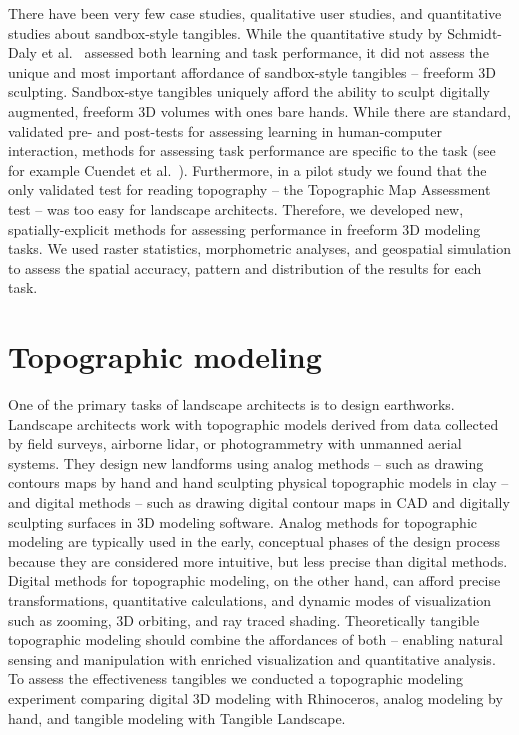 \documentclass[Afour,sagev,times]{sagej} %
\begin{document}
There have been very few 
case studies, \cite{Ishii2002,Tateosian2010,Petrasova2015}
qualitative user studies, 
\cite{Shamonsky2003,Woods2016}
and quantitative studies \cite{Schmidt-daly2016b}
about sandbox-style tangibles.
%
While the quantitative study by
Schmidt-Daly et al.~\cite{Schmidt-daly2016b} 
assessed both learning and task performance,
it did not assess the unique and most important 
affordance of sandbox-style tangibles --
freeform 3D sculpting. 
% 
Sandbox-stye tangibles uniquely afford
the ability to sculpt digitally augmented, 
freeform 3D volumes
with ones bare hands. 
%
While there are standard, validated
pre- and post-tests for assessing learning
in human-computer interaction,
methods for assessing task performance 
are specific to the task
(see for example Cuendet et al.~\cite{Cuendet2012}).
%
Furthermore,
in a pilot study we found that the only 
validated test for reading topography -- the
Topographic Map Assessment test
\cite{Newcombe2015} --
was too easy for landscape architects.
%
Therefore, we developed 
new, spatially-explicit methods
for assessing performance
in freeform 3D modeling tasks.
%
We used raster statistics, 
morphometric analyses, and geospatial simulation
to assess the spatial accuracy, pattern and distribution
of the results for each task. 


\section{Topographic modeling}
%
One of the primary tasks of landscape architects is to design earthworks.
\cite{Petschek2008,Strom2013}
Landscape architects work with topographic models 
derived from data collected by field surveys, airborne lidar, 
or photogrammetry with unmanned aerial systems.
They design new landforms 
using analog methods -- such as 
drawing contours maps by hand and
hand sculpting physical topographic models in clay --
and digital methods -- such as 
drawing digital contour maps in CAD and
digitally sculpting surfaces in 3D modeling software. 
Analog methods for topographic modeling are typically used 
in the early, conceptual phases of the design process because 
they are considered more intuitive, but less precise than digital methods.
Digital methods for topographic modeling, on the other hand, 
can afford precise transformations, 
quantitative calculations, 
and dynamic modes of visualization such as 
zooming, 3D orbiting, and ray traced shading.
Theoretically tangible topographic modeling 
should combine the affordances of both -- 
enabling natural sensing and manipulation
with enriched visualization and quantitative analysis.
To assess the effectiveness tangibles
we conducted a topographic modeling experiment
comparing 
digital 3D modeling with Rhinoceros, 
analog modeling by hand, 
and tangible modeling with Tangible Landscape. 
\end{document}
